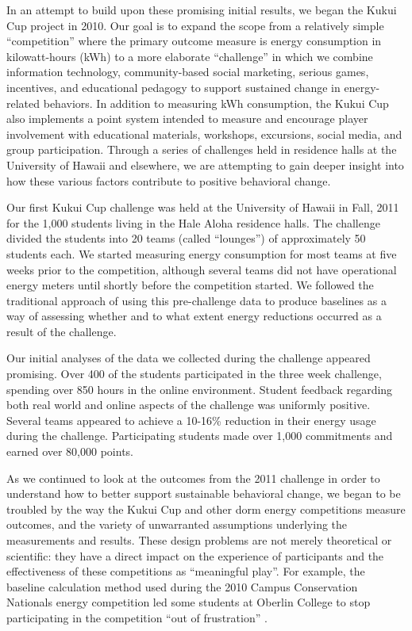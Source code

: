 \documentclass[jou]{apa} %
\begin{document}
In an attempt to build upon these promising initial results, we began the Kukui Cup
project in 2010.  Our goal is to expand the scope from a relatively simple ``competition''
where the primary outcome measure is energy consumption in kilowatt-hours (kWh) to a more
elaborate ``challenge'' in which we combine information technology, community-based social
marketing, serious games, incentives, and educational pedagogy to support sustained change
in energy-related behaviors.  In addition to measuring kWh consumption, the Kukui Cup also
implements a point system intended to measure and encourage player involvement with
educational materials, workshops, excursions, social media, and group participation.
Through a series of challenges held in residence halls at the University of Hawaii and
elsewhere, we are attempting to gain deeper insight into how these various factors
contribute to positive behavioral change.

Our first Kukui Cup challenge was held at the University of Hawaii in Fall, 2011 for the
1,000 students living in the Hale Aloha residence halls. The challenge divided the
students into 20 teams (called ``lounges'') of approximately 50 students each.  We started
measuring energy consumption for most teams at five weeks prior to the competition,
although several teams did not have operational energy meters until shortly before the
competition started. We followed the traditional approach of using this pre-challenge data
to produce baselines as a way of assessing whether and to what extent energy reductions
occurred as a result of the challenge.

Our initial analyses of the data we collected during the challenge appeared promising.
Over 400 of the students participated in the three week challenge, spending over 850 hours
in the online environment.  Student feedback regarding both real world and online aspects
of the challenge was uniformly positive.  Several teams appeared to achieve a 10-16\%
reduction in their energy usage during the challenge.  Participating students made over
1,000 commitments and earned over 80,000 points.

As we continued to look at the outcomes from the 2011 challenge in order to understand how
to better support sustainable behavioral change, we began to be troubled by the way the
Kukui Cup and other dorm energy competitions measure outcomes, and the variety of
unwarranted assumptions underlying the measurements and results.  These design problems
are not merely theoretical or scientific: they have a direct impact on the experience of
participants and the effectiveness of these competitions as ``meaningful play''.  For
example, the baseline calculation method used during the 2010 Campus Conservation
Nationals energy competition led some students at Oberlin College to stop participating in
the competition ``out of frustration'' \cite{Willens2010}.
\end{document}

